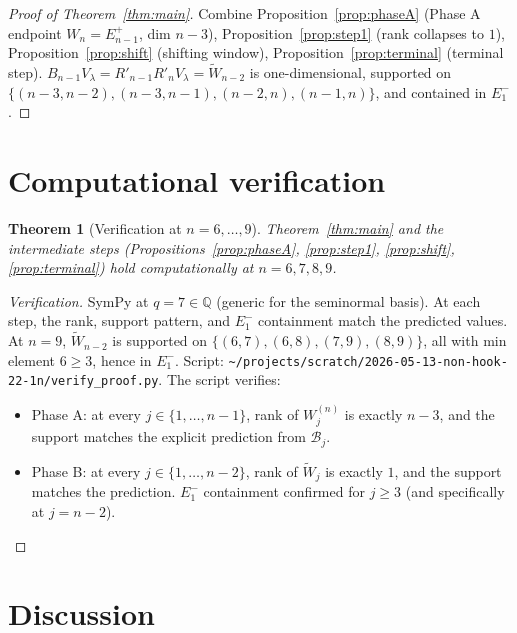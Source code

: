 \documentclass[11pt]{article}
\newtheorem{theorem}{Theorem}
\theoremstyle{definition}
\begin{document}
\begin{proof}[Proof of Theorem~\ref{thm:main}]
Combine Proposition~\ref{prop:phaseA} (Phase A endpoint
$W_n = E_{n-1}^+$, dim $n-3$),
Proposition~\ref{prop:step1} (rank collapses to $1$),
Proposition~\ref{prop:shift} (shifting window),
Proposition~\ref{prop:terminal} (terminal step).
$B_{n-1}V_\lambda = R'_{n-1}R'_n V_\lambda = \widetilde{W}_{n-2}$
is one-dimensional, supported on
$\{(n-3,n-2),(n-3,n-1),(n-2,n),(n-1,n)\}$, and contained in $E_1^-$.
\end{proof}

\section{Computational verification}

\begin{theorem}[Verification at $n=6,\ldots,9$]\label{thm:verify}
Theorem~\ref{thm:main} and the intermediate steps
(Propositions~\ref{prop:phaseA}, \ref{prop:step1}, \ref{prop:shift},
\ref{prop:terminal}) hold computationally at $n = 6, 7, 8, 9$.
\end{theorem}

\begin{proof}[Verification]
SymPy at $q = 7 \in \mathbb{Q}$ (generic for the seminormal basis).
At each step, the rank, support pattern, and $E_1^-$ containment match
the predicted values.  At $n=9$, $\widetilde{W}_{n-2}$ is supported
on $\{(6,7),(6,8),(7,9),(8,9)\}$, all with min element $6 \ge 3$,
hence in $E_1^-$.  Script:
\texttt{\textasciitilde/projects/scratch/2026-05-13-non-hook-22-1n/verify\_proof.py}.
The script verifies:
\begin{itemize}[leftmargin=2em,topsep=0.3em,itemsep=0.2em]
\item Phase A: at every $j \in \{1,\ldots,n-1\}$, rank of $W_j^{(n)}$
is exactly $n-3$, and the support matches the explicit prediction
from $\mathcal{B}_j$.
\item Phase B: at every $j \in \{1,\ldots,n-2\}$, rank of
$\widetilde{W}_j$ is exactly $1$, and the support matches the
prediction.  $E_1^-$ containment confirmed for $j \ge 3$ (and
specifically at $j = n-2$).
\end{itemize}
\end{proof}

\section{Discussion}\label{sec:discuss}
\end{document}
